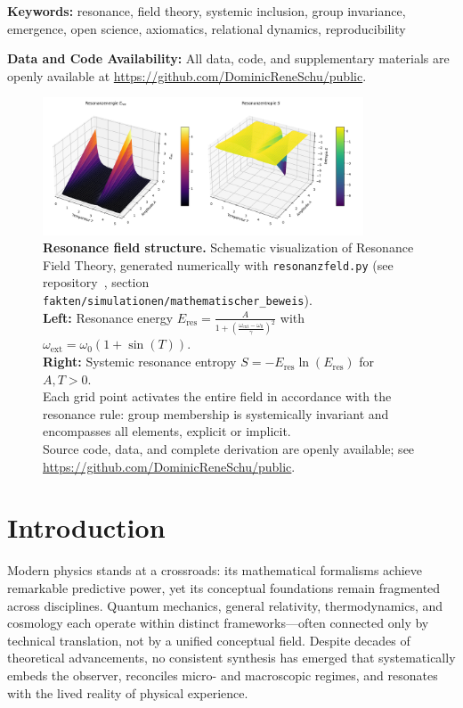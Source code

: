 \documentclass[12pt]{iopart}
\newcommand{\keywords}[1]{\textbf{Keywords:} #1}
\newcommand{\dataavailability}{\textbf{Data and Code Availability:} All data, code, and supplementary materials are openly available at \url{https://github.com/DominicReneSchu/public}.}
\begin{document}
	\keywords{resonance, field theory, systemic inclusion, group invariance, emergence, open science, axiomatics, relational dynamics, reproducibility}
	
\dataavailability

\begin{figure}[ht]
	\centering
	\includegraphics[width=0.85\textwidth]{figures/plot.png}
	\caption{
		\textbf{Resonance field structure.}
		Schematic visualization of Resonance Field Theory, generated numerically with \texttt{resonanzfeld.py} (see repository~\cite{rftrepo}, section \texttt{fakten/simulationen/mathematischer\_beweis}).\\
		\textbf{Left:} Resonance energy $E_{\mathrm{res}} = \frac{A}{1 + \left(\frac{\omega_\mathrm{ext} - \omega_0}{\gamma}\right)^2}$ with $\omega_\mathrm{ext} = \omega_0 (1 + \sin(T))$.\\
		\textbf{Right:} Systemic resonance entropy $S = -E_{\mathrm{res}}\ln(E_{\mathrm{res}})$ for $A, T > 0$.\\
		Each grid point activates the entire field in accordance with the resonance rule: group membership is systemically invariant and encompasses all elements, explicit or implicit.\\
		Source code, data, and complete derivation are openly available; see \url{https://github.com/DominicReneSchu/public}.
	}
	\label{fig:resonance_field_plot}
\end{figure}

\section{Introduction}

Modern physics stands at a crossroads: its mathematical formalisms achieve remarkable predictive power, yet its conceptual foundations remain fragmented across disciplines. Quantum mechanics, general relativity, thermodynamics, and cosmology each operate within distinct frameworks—often connected only by technical translation, not by a unified conceptual field. Despite decades of theoretical advancements, no consistent synthesis has emerged that systematically embeds the observer, reconciles micro- and macroscopic regimes, and resonates with the lived reality of physical experience.
\end{document}
